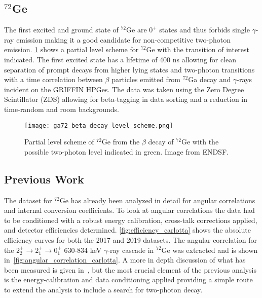 \documentclass[cnatzke_thesis_proposal.tex]{subfiles}
\begin{document}
\subsection{$^{72}$Ge}
The first excited and ground state of $^{72}$Ge are $0^+$ states and thus forbids single $\gamma$-ray emission making it a good candidate for non-competitive two-photon emission. 
\ref{fig:ga72_level_scheme} shows a partial level scheme for $^{72}$Ge with the transition of interest indicated. 
The first excited state has a lifetime of 400 ns allowing for clean separation of prompt decays from higher lying states and two-photon transitions with a time correlation between $\beta$ particles emitted from $^{72}$Ga decay and $\gamma$-rays incident on the GRIFFIN HPGes.
The data was taken using the Zero Degree Scintillator (ZDS) allowing for beta-tagging in data sorting and a reduction in time-random and room backgrounds.

\begin{figure}[htbp]
  \centering
  \texttt{[image: ga72\_beta\_decay\_level\_scheme.png]}
  \caption{Partial level scheme of $^{72}$Ge from the $\beta$ decay of $^{72}$Ge with the possible two-photon level indicated in green. Image from ENDSF.}
  \label{fig:ga72_level_scheme}
\end{figure}

\subsection{Previous Work}
The dataset for $^{72}$Ge has already been analyzed in detail for angular correlations and internal conversion coefficients. 
To look at angular correlations the data had to be conditioned with a robust energy calibration, cross-talk corrections applied, and detector efficiencies determined.
\ref{fig:efficiency_carlotta} shows the absolute efficiency curves for both the 2017 and 2019 datasets.
The angular correlation for the $2_2^+ \rightarrow 2_1^+ \rightarrow 0_1^+$ 630-834 keV $\gamma$-ray cascade in $^{72}$Ge was extracted and is shown in~\ref{fig:angular_correlation_carlotta}.
A more in depth discussion of what has been measured is given in~\cite{porzio_configuration_2021}, but the most crucial element of the previous analysis is the energy-calibration and data conditioning applied providing a simple route to extend the analysis to include a search for two-photon decay. 
\end{document}
